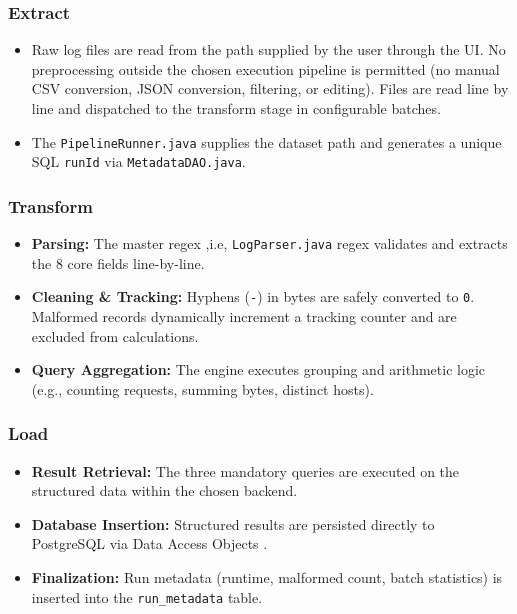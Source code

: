 \documentclass[11pt,a4paper]{article}
\begin{document}
\subsubsection{Extract}
\begin{itemize}
  \item Raw log files are read from the path supplied by the user through the UI. No preprocessing outside the chosen execution pipeline is permitted (no manual CSV conversion, JSON conversion, filtering, or editing). Files are read line by line and dispatched to the transform stage in configurable batches.
  \item The \texttt{PipelineRunner.java} supplies the dataset path and generates a unique SQL \texttt{runId} via \texttt{MetadataDAO.java}.
\end{itemize}

\subsubsection{Transform}
\begin{itemize}
  \item \textbf{Parsing:} The master regex ,i.e, \texttt{LogParser.java} regex validates and extracts the 8 core fields line-by-line.
  \item \textbf{Cleaning \& Tracking:} Hyphens (\texttt{-}) in bytes are safely converted to \texttt{0}. Malformed records dynamically increment a tracking counter and are excluded from calculations.
  \item \textbf{Query Aggregation:} The engine executes grouping and arithmetic logic (e.g., counting requests, summing bytes, distinct hosts).
\end{itemize}

\subsubsection{Load}
\begin{itemize}
  \item \textbf{Result Retrieval:} The three mandatory queries are executed on the structured data within the chosen backend.
  \item \textbf{Database Insertion:} Structured results are persisted directly to PostgreSQL via Data Access Objects .
  \item \textbf{Finalization:} Run metadata (runtime, malformed count, batch statistics) is inserted into the \texttt{run\_metadata} table.
\end{itemize}
\end{document}
